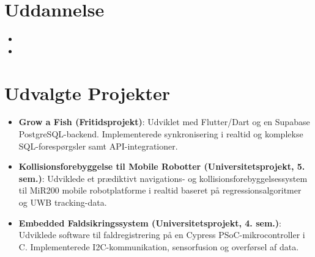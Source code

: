 \documentclass[11pt,a4paper,sans]{moderncv}
\begin{document}

\section{Uddannelse}
\vspace{1pt}
\begin{itemize}

\item{}

\vspace{3pt}

\item{}

\end{itemize}


\section{Udvalgte Projekter}
\vspace{1pt}
\begin{itemize}

\item{\textbf{Grow a Fish (Fritidsprojekt)}: Udviklet med Flutter/Dart og en Supabase PostgreSQL-backend. Implementerede synkronisering i realtid og komplekse SQL-forespørgsler samt API-integrationer.}

\item{\textbf{Kollisionsforebyggelse til Mobile Robotter (Universitetsprojekt, 5. sem.)}: Udviklede et prædiktivt navigations- og kollisionsforebyggelsessystem til MiR200 mobile robotplatforme i realtid baseret på regressionsalgoritmer og UWB tracking-data.}

\item{\textbf{Embedded Faldsikringssystem (Universitetsprojekt, 4. sem.)}: Udviklede software til faldregistrering på en Cypress PSoC-mikrocontroller i C. Implementerede I2C-kommunikation, sensorfusion og overførsel af data.}

\end{itemize}
\end{document}
